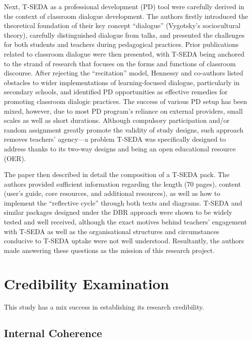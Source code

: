 \documentclass[
        a4paper, %
        12pt, %
        stu, %
        donotrepeattitle, %
        floatsintext, %
        biblatex, %
        twoside, %
        colorlinks=true,        %
        linkcolor=red,          %
        anchorcolor=red,      %
        citecolor=blue,         %
        urlcolor=blue,          %
        bookmarks=true,         %
        bookmarksopen=false,    %
        bookmarksnumbered=true,  %
        dvipsnames
]{apa7}
\begin{document}
Next, T-SEDA as a professional development (PD) tool were carefully derived in the context of classroom dialogue development. The authors firstly introduced the theoretical foundation of their key concept ``dialogue'' (Vygotsky's sociocultural theory), carefully distinguished dialogue from talks, and presented the challenges for both students and teachers during pedagogical practices. Prior publications related to classroom dialogue were then presented, with T-SEDA being anchored to the strand of research that focuses on the forms and functions of classroom discourse. After rejecting the ``recitation'' model, Hennessy and co-authors listed obstacles to wider implementations of learning-focused dialogue, particularly in secondary schools, and identified PD opportunities as effective remedies for promoting classroom dialogic practices. The success of various PD setup has been mixed, however, due to most PD program's reliance on external providers, small scales as well as short durations. Although compulsory participation and/or random assignment greatly promote the validity of study designs, such approach removes teachers' agency---a problem T-SEDA was specifically designed to address thanks to its two-way designs and being an open educational resource (OER).

The paper then described in detail the composition of a T-SEDA pack. The authors provided sufficient information regarding the length (70 pages), content (user's guide, core resources, and additional resources), as well as how to implement the ``reflective cycle'' through both texts and diagrams. T-SEDA and similar packages designed under the DBR approach were shown to be widely tested and well received, although the exact motives behind teachers' engagement with T-SEDA as well as the organisational structures and circumstances conducive to T-SEDA uptake were not well understood. Resultantly, the authors made answering these questions as the mission of this research project.

\section{Credibility Examination} %

This study has a mix success in establishing its research credibility.

\subsection{Internal Coherence} %
\end{document}
